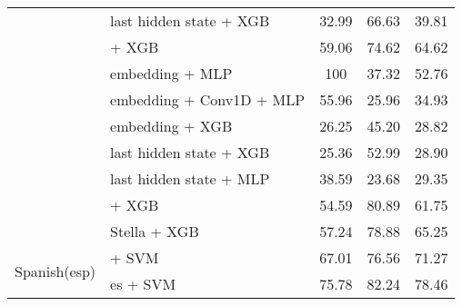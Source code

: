 \begin{longtable}{p{4cm}p{6cm}ccc}
                                          & \citep{DBLP:journals/corr/abs-1907-11692} last hidden state + XGB      & 32.99                                & 66.63              & 39.81             \\
                                          & \citep{ni2021sentencet5scalablesentenceencoders} + XGB                 & 59.06                                & 74.62              & 64.62             \\
                                          & \citep{DBLP:journals/corr/abs-1911-02116} embedding + MLP              & 100                                  & 37.32              & 52.76             \\
                                          & \citep{DBLP:journals/corr/abs-1911-02116} embedding + Conv1D + MLP     & 55.96                                & 25.96              & 34.93             \\
                                          & \citep{DBLP:journals/corr/abs-1911-02116} embedding + XGB              & 26.25                                & 45.20              & 28.82             \\
                                          & \citep{DBLP:journals/corr/abs-1911-02116} last hidden state + XGB      & 25.36                                & 52.99              & 28.90             \\
                                          & \citep{DBLP:journals/corr/abs-1911-02116} last hidden state + MLP      & 38.59                                & 23.68              & 29.35             \\
                                          & \citep{lee2024nv} + XGB                                                & 54.59                                & 80.89              & 61.75             \\
                                          & \citep{zhang2025jasperstelladistillationsota} Stella + XGB             & 57.24                                & 78.88              & 65.25             \\
    \midrule
    \multirow{6}{*}{Spanish(esp)}         & \citep{CaneteCFP2020}  + SVM                                           & 67.01                                & 76.56              & 71.27             \\
                                          & \citep{mohr2024multi} es + SVM                                         & 75.78                                & 82.24              & 78.46             \\

\end{longtable}
